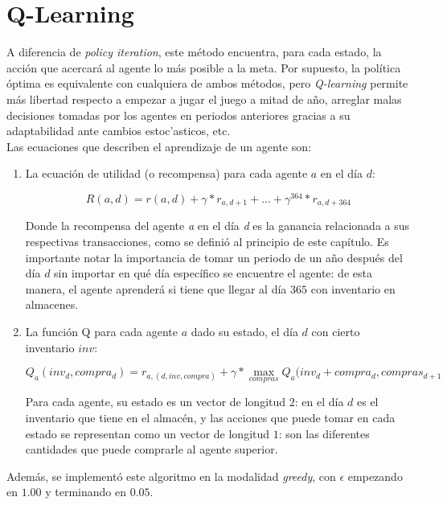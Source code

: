 \section{Q-Learning}

A diferencia de \textit{policy iteration}, este m\'etodo encuentra, para cada estado, la acci\'on que acercar\'a al agente lo m\'as posible a la meta. Por supuesto, la pol\'itica \'optima es equivalente con cualquiera de ambos m\'etodos, pero \textit{Q-learning} permite m\'as libertad respecto a empezar a jugar el juego a mitad de a\~no, arreglar malas decisiones tomadas por los agentes en periodos anteriores gracias a su adaptabilidad ante cambios estoc'asticos, etc.\\

Las ecuaciones que describen el aprendizaje de un agente son:

\begin{enumerate}
    \item La ecuaci\'on de utilidad (o recompensa) para cada agente $a$ en el d\'ia $d$:

$$
R(a, d) = r(a,d) + \gamma*r_{a, d+1} + ... + \gamma^{364}*r_{a,d+364}
$$

Donde la recompensa del agente \textit{a} en el d\'ia \textit{d} es la ganancia relacionada a sus respectivas transacciones, como se defini\'o al principio de este cap\'itulo. Es importante notar la importancia de tomar un periodo de un a\~no despu\'es del d\'ia $d$ sin importar en qu\'e d\'ia espec\'ifico se encuentre el agente: de esta manera, el agente aprender\'a si tiene que llegar al d\'ia $365$ con inventario en almacenes.

    \item La funci\'on Q para cada agente $a$ dado su estado, el d\'ia $d$ con cierto inventario $inv$:

$$
Q_{a}(inv_{d},compra_{d}) = r_{a, (d, inv, compra)} + \gamma * \max_{compras}{Q_{a}(inv_{d} + compra_{d}, compras_{d+1}}
$$

Para cada agente, su estado es un vector de longitud $2$: en el d\'ia $d$ es el inventario que tiene en el almac\'en, y las acciones que puede tomar en cada estado se representan como un vector de longitud $1$: son las diferentes cantidades que puede comprarle al agente superior.
\end{enumerate}

Adem\'as, se implement\'o este algoritmo en la modalidad \textit{greedy}, con $\epsilon$ empezando en $1.00$ y terminando en $0.05$.


